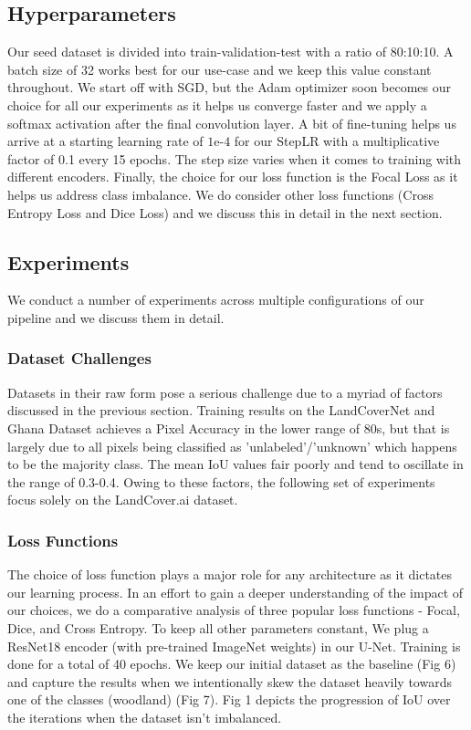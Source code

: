 \documentclass[conference]{IEEEtran}
\begin{document}
\subsection{Hyperparameters}
Our seed dataset is divided into train-validation-test with a ratio of 80:10:10. A batch size of 32 works best for our use-case and we keep this value constant throughout. We start off with SGD, but the Adam optimizer soon becomes our choice for all our experiments as it helps us converge faster and we apply a softmax activation after the final convolution layer. A bit of fine-tuning helps us arrive at a starting learning rate of $1\text{e-}4$ for our StepLR with a multiplicative factor of 0.1 every 15 epochs. The step size varies when it comes to training with different encoders. Finally, the choice for our loss function is the Focal Loss as it helps us address class imbalance. We do consider other loss functions (Cross Entropy Loss and Dice Loss) and we discuss this in detail in the next section.
\subsection{Experiments}
We conduct a number of experiments across multiple configurations of our pipeline and we discuss them in detail.

\subsubsection{Dataset Challenges}
Datasets in their raw form pose a serious challenge due to a myriad of factors discussed in the previous section. Training results on the LandCoverNet and Ghana Dataset achieves a Pixel Accuracy in the lower range of 80s, but that is largely due to all pixels being classified as 'unlabeled'/'unknown' which happens to be the majority class. The mean IoU values fair poorly and tend to oscillate in the range of 0.3-0.4. Owing to these factors, the following set of experiments focus solely on the LandCover.ai dataset.

\subsubsection{Loss Functions} The choice of loss function plays a major role for any architecture as it dictates our learning process. In an effort to gain a deeper understanding of the impact of our choices, we do a comparative analysis of three popular loss functions - Focal, Dice, and Cross Entropy. To keep all other parameters constant, We plug a ResNet18 encoder (with pre-trained ImageNet weights) in our U-Net. Training is done for a total of 40 epochs. We keep our initial dataset as the baseline (Fig 6) and capture the results when we intentionally skew the dataset heavily towards one of the classes (woodland) (Fig 7). Fig 1 depicts the progression of IoU over the iterations when the dataset isn't imbalanced.
\end{document}
